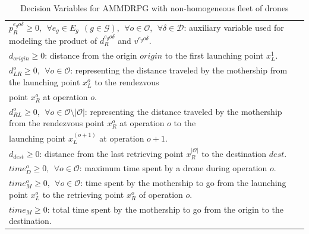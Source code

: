\documentclass[10pt,a4paper]{elsarticle}
\begin{document}
\begin{table}[h!]
\begin{tabular}{|l|}
		$p_R^{e_go\delta} \geq 0, \:\: \forall e_g \in E_g\:\: (g \in \mathcal{G}), \:\:\forall o \in \mathcal O, \:\:\forall \delta\in\mathcal D$: auxiliary variable used for modeling the product of $d_R^{e_go\delta}$ and $v^{e_go\delta}$.\\
		$d_{origin}\geq 0$: distance from the origin $origin$ to the first launching point $x_L^1$.\\
		$d_{LR}^o \geq 0, \:\: \forall o \in \mathcal O$: representing the distance traveled by the mothership from the launching point $x_L^o$ to the rendezvous\\
		\hspace*{1cm}   point $x_R^o$ at operation $o$.\\
		$d_{RL}^o \geq 0, \:\: \forall o \in \mathcal O\setminus|\mathcal O|$: representing the distance traveled by the mothership from the rendezvous point $x_R^o$ at operation $o$ to the \\ 
		\hspace*{1cm}  launching point $x_L^{(o+1)}$ at operation $o+1$.\\
		$d_{dest}\geq 0$: distance from the last retrieving point $x_R^{|\mathcal O|}$ to the destination $dest$.\\
		$time_D^o \geq 0, \:\: \forall o \in \mathcal O$: maximum time spent by a drone during operation $o$.\\
		$time_M^o \geq 0, \:\: \forall o \in \mathcal O$: time spent by the mothership to go from the launching point $x_L^o$ to the retrieving point $x_R^o$ of operation $o$.\\
		$time_M \geq 0$: total time spent by the mothership to go from the origin to the destination.\\
		\hline
	\end{tabular}
	\caption{Decision Variables for AMMDRPG with non-homogeneous fleet of drones}
	\label{table:At2}
\end{table}
\end{document}
